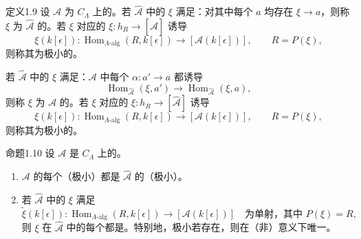 \begin{SGAresult}{定义}{1.9}
设 $\mathcal A$ 为 $C_\Lambda$ 上的。若 $\widehat{\mathcal A}$ 中的 $\xi$ 满足：对其中每个 $a$ 均存在 $\xi\to a$，则称 $\xi$ 为 $\widehat{\mathcal A}$ 的。若 $\xi$ 对应的 $\xi:h_R\to[\widehat{\mathcal A}]$ 诱导
\[\xi(k[\epsilon]):\operatorname{Hom}_{\Lambda\text{-alg}}(R,k[\epsilon])\longrightarrow[\mathcal A(k[\epsilon])],
\qquad R=P(\xi),\]
则称其为极小的。

若 $\widehat{\mathcal A}$ 中的 $\xi$ 满足：$\mathcal A$ 中每个 $\alpha:a'\to a$ 都诱导
\[\operatorname{Hom}_{\widehat{\mathcal A}}(\xi,a')\longrightarrow
\operatorname{Hom}_{\widehat{\mathcal A}}(\xi,a),\]
则称 $\xi$ 为 $\mathcal A$ 的。若 $\xi$ 对应的 $\xi:h_R\to[\widehat{\mathcal A}]$ 诱导
\[\xi(k[\epsilon]):\operatorname{Hom}_{\Lambda\text{-alg}}(R,k[\epsilon])\longrightarrow[\mathcal A(k[\epsilon])],
\qquad R=P(\xi),\]
则称其为极小的。
\end{SGAresult}
\begin{SGAresult}{命题}{1.10}
设 $\mathcal A$ 是 $C_\Lambda$ 上的。
\begin{enumerate}
\item[(i)] $\mathcal A$ 的每个（极小）都是 $\widehat{\mathcal A}$ 的（极小）。
\item[(ii)] 若 $\widehat{\mathcal A}$ 中的 $\xi$ 满足
\[\widetilde\xi(k[\epsilon]):\operatorname{Hom}_{\Lambda\text{-alg}}(R,k[\epsilon])\to[\mathcal A(k[\epsilon])]
\quad\text{为单射，其中 }P(\xi)=R,\]
则 $\xi$ 在 $\widehat{\mathcal A}$ 中的每个都是。特别地，极小若存在，则在（非）意义下唯一。
\end{enumerate}
\end{SGAresult}
